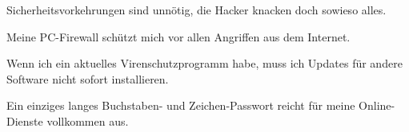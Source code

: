 \item Sicherheitsvorkehrungen sind unnötig, die Hacker knacken doch sowieso alles.
\item Meine PC-Firewall schützt mich vor allen Angriffen aus dem Internet.
\item Wenn ich ein aktuelles Virenschutzprogramm habe, muss ich Updates für andere Software nicht sofort installieren.
\item Ein einziges langes Buchstaben- und Zeichen-Passwort reicht für meine Online-Dienste vollkommen aus.
